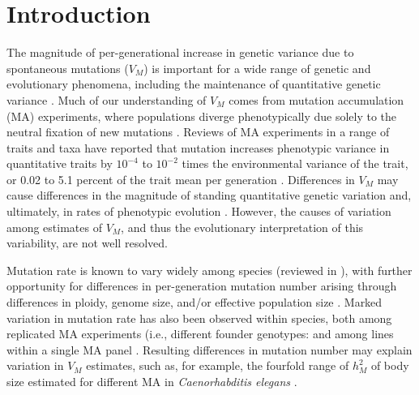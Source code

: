 \section{Introduction}
The magnitude of per-generational increase in genetic variance due to spontaneous mutations ($V_M$) is important for a wide range of genetic and evolutionary phenomena, including the maintenance of quantitative genetic variance \citep{Lync88b, Bart89, John05}. Much of our understanding of $V_M$ comes from mutation accumulation (MA) experiments, where populations diverge phenotypically due solely to the neutral fixation of new mutations \citep{Muka64,Hall09}. Reviews of MA experiments in a range of traits and taxa have reported that mutation increases phenotypic variance in quantitative traits by $10^{-4}$ to $10^{-2}$ times the environmental variance of the trait, or 0.02 to 5.1 percent of the trait mean per generation \citep{Houl96, Lync99, Hall09}. Differences in $V_M$ may cause differences in the magnitude of standing quantitative genetic variation and, ultimately, in rates of phenotypic evolution \citep{Houl98,Lync99,Houl17,Wals18c28}. However, the causes of variation among estimates of $V_M$, and thus the evolutionary interpretation of this variability, are not well resolved.\par

Mutation rate is known to vary widely among species (reviewed in \citealp{Katj19}), with further opportunity for differences in per-generation mutation number arising through differences in ploidy, genome size, and/or effective population size \citep{Lync99,Lync10,Sung12}. Marked variation in mutation rate has also been observed within species, both among replicated MA experiments (i.e., different founder genotypes: \citealp{Ness12,Sung12,Schr13, Ho20} and among lines within a single MA panel \citep{Huan16,Ho20}. Resulting differences in mutation number may explain variation in $V_M$ estimates, such as, for example, the fourfold range of $h_M^2$ of body size estimated for different MA in \textit{Caenorhabditis elegans} \citep{Azev02, Este05, Ostr07}.\par

